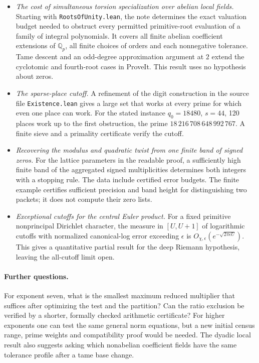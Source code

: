 \documentclass[11pt]{article}
\newcommand{\Q}{\mathbb Q}
\begin{document}
\begin{itemize}
\item \emph{The cost of simultaneous torsion specialization over abelian local
fields.} Starting with \texttt{RootsOfUnity.lean}, the note determines the exact
valuation budget needed to obstruct every permitted primitive-root evaluation
of a family of integral polynomials. It covers all finite abelian coefficient
extensions of $\Q_p$, all finite choices of orders and each nonnegative
tolerance. Tame descent and an odd-degree approximation argument at $2$
extend the cyclotomic and fourth-root cases in ProveIt. This result uses no
hypothesis about zeros.
\item \emph{The sparse-place cutoff.} A refinement of the digit construction
in the source file \texttt{Existence.lean} gives a large set that works at
every prime for which even one place can work. For the stated instance
$q_0=18480$, $s=44$, 120 places work up to the first obstruction,
the prime $18\,216\,708\,648\,992\,767$. A finite sieve and a primality
certificate verify the cutoff.
\item \emph{Recovering the modulus and quadratic twist from one finite band
of signed zeros.} For the lattice parameters in the readable proof, a
sufficiently high finite band of the aggregated signed multiplicities
determines both integers with a stopping rule. The data include certified
error budgets. The finite example certifies sufficient precision and band
height for distinguishing two packets; it does not compute their zero lists.
\item \emph{Exceptional cutoffs for the central Euler product.} For a fixed
primitive nonprincipal Dirichlet character, the measure in $[U,U+1]$ of
logarithmic cutoffs with normalized canonical-log error exceeding $\epsilon$
is $O_{\chi,\epsilon}(e^{-\sqrt{2\pi\epsilon U}})$. This gives a quantitative
partial result for the deep Riemann hypothesis, leaving the all-cutoff
limit open.
\end{itemize}
\paragraph{Further questions.}
For exponent seven, what is the smallest maximum reduced multiplier
that suffices after optimizing the test and the partition? Can the
ratio exclusion be verified by a shorter, formally checked arithmetic
certificate? For higher exponents one can test the same general norm
equations, but a new initial census range, prime weights and compatibility
proof would be needed. The dyadic local result also suggests asking
which nonabelian coefficient fields have the same tolerance profile after
a tame base change.
\end{document}
